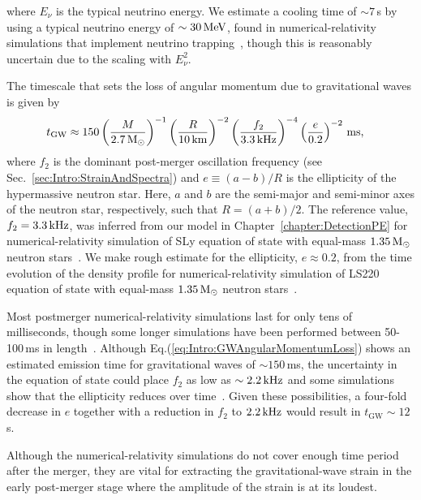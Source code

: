 \documentclass[../Thesis.tex]{subfiles}
\begin{document}
    where $E_\nu$ is the typical neutrino energy.
    We estimate a cooling time of $\sim 7$\,s by using a typical neutrino energy of $\sim 30\,\mathrm{MeV}$, found in numerical-relativity simulations that implement neutrino trapping~\cite{Sumiyoshi2020}, though this is reasonably uncertain due to the scaling with $E_\nu^2$.\par
    

    The timescale that sets the loss of angular momentum due to gravitational waves is given by~\cite{Paschalidis2012}
    \begin{align}
        t_{\mathrm{GW}} & \approx 150 \left(\frac{M}{2.7\,\mathrm{M}_{\odot}}\right)^{-1}\left(\frac{R}{10\,\mathrm{km}}\right)^{-2}\left(\frac{f_2}{3.3\,\mathrm{kHz}} \right)^{-4}\left(\frac{e}{0.2} \right)^{-2}\,\mathrm{ms}, \label{eq:Intro:GWAngularMomentumLoss}        
    \end{align}
    where $f_2$ is the dominant post-merger oscillation frequency (see Sec.~\ref{sec:Intro:StrainAndSpectra}) and $e\equiv(a-b)/R$ is the ellipticity of the hypermassive neutron star. 
    Here, $a$ and $b$ are the semi-major and semi-minor axes of the neutron star, respectively, such that $R=(a+b)/2$.
    The reference value, $f_2=3.3\,\mathrm{kHz}$, was inferred from our model in Chapter~\ref{chapter:DetectionPE} for numerical-relativity simulation of SLy equation of state with equal-mass $1.35\,\mathrm{M}_{\odot}$ neutron stars~\cite{Radice2016}.
    We make rough estimate for the ellipticity,  $e\approx0.2$, from the time evolution of the density profile for numerical-relativity simulation of LS220 equation of state with equal-mass $1.35\,\mathrm{M}_{\odot}$ neutron stars~\cite{Radice2017}.\par
  
    Most postmerger numerical-relativity simulations last for only tens of milliseconds, though some longer simulations have been performed between 50-100\,ms in length~\cite{Rezzolla2010,Ciolfi2017,Ciolfi2019,DePietri2020}.
    Although Eq.(\ref{eq:Intro:GWAngularMomentumLoss}) shows an estimated emission time for gravitational waves of $\sim 150\,$ms, the uncertainty in the equation of state could place $f_2$ as low as $\sim 2.2\,\mathrm{kHz}$ and some simulations show that the ellipticity reduces over time~\cite{Takami2015,Shibata2017a}.
    Given these possibilities, a four-fold decrease in $e$ together with a reduction in $f_2$ to $2.2\,\mathrm{kHz}$ would result in $t_{\mathrm{GW}} \sim 12\,$s.
    
    Although the numerical-relativity simulations do not cover enough time period after the merger, they are vital for extracting the gravitational-wave strain in the early post-merger stage where the amplitude of the strain is at its loudest.
 
\end{document}
